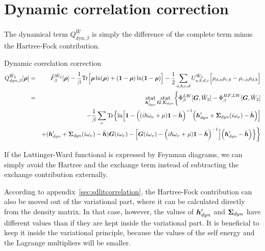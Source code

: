 \documentclass[11pt,a4paper]{report}
\begin{document}
\section{Dynamic correlation correction}
\label{sec:dyncorelcorr}
The dynamical term $Q_{\text{dyn},\beta}^{\hat{W}}$
is simply the difference of the complete term minus
the Hartree-Fock contribution.
\begin{myshadowminipage}{Dynamic correlation correction}
\begin{eqnarray}
Q^{\hat{W}_2}_{dyn,\beta}[\bm{\rho}]
&=&\tilde{F}^{\hat{W}_2}_\beta[\bm{\rho}]
-
\frac{1}{\beta}\mathrm{Tr}\Bigl[
\bm{\rho}\ln(\bm{\rho})+(\bm{1}-\bm{\rho})\ln(\bm{1}-\bm{\rho})\Bigr]
-
\frac{1}{2}\sum_{a,b,c,d}U^{\hat{W}_2}_{a,b,d,c}
\Bigl[\rho_{d,a}\rho_{c,b}-\rho_{c,a}\rho_{d,b}\Bigr]
\nonumber\\
&=&
\operatorname*{stat}_{\bm{h}'_{dyn}}\operatorname*{stat}_{\bm{G},\bm{\Sigma}_{dyn}}
\biggl\lbrace
\Phi^{LW}_\beta[\bm{G},\hat{W}_2]-\Phi^{HF,LW}_\beta[\bm{G},\hat{W}_2]
\nonumber\\
&&-\frac{1}{\beta}\sum_\nu\mathrm{Tr}\Bigl\lbrace
\ln\Bigl[
\bm{1}-
\Bigl((i\hbar\omega_\nu+\mu)\bm{1}-\bar{\bm{h}}\Bigr)^{-1}
\Bigl(\bm{h}'_{dyn}+\bm{\Sigma}_{dyn}(i\omega_\nu)-\bar{\bm{h}}\Bigr)
\Bigr]
\nonumber\\&&
+(\bm{h}'_{dyn}+\bm{\Sigma}_{dyn}(i\omega_\nu)-\bar{\bm{h}})\bm{G}(i\omega_\nu)
-
\Bigl[
\bm{G}(i\omega_\nu)
-\Bigl(i\hbar\omega_\nu+\mu)\bm{1}-\bar{\bm{h}}\Bigr)^{-1}
\Bigr]
\Bigl(\bm{h}'_{dyn}-\bar{\bm{h}}\Bigr)\Bigr\rbrace
\biggr\rbrace
\nonumber\\
\label{eq:dmf1green}
\end{eqnarray}
\end{myshadowminipage}
If the Luttinger-Ward functional is expressed by Feynman diagrams, we
can simply avoid the Hartree and the exchange term instead of
subtracting the exchange contribution externally. 

According to appendix~\ref{sec:sdlitcorrelation}, the Hartree-Fock
contribution can also be moved out of the variational part, where it
can be calculated directly from the density matrix. In that case,
however, the values of $\bm{h}'_{dyn}$ and $\bm{\Sigma}_{dyn}$ have
different values than if they are kept inside the variational part. It
is beneficial to keep it inside the variational principle, because the
values of the self energy and the Lagrange multipliers will be
smaller.
\end{document}
